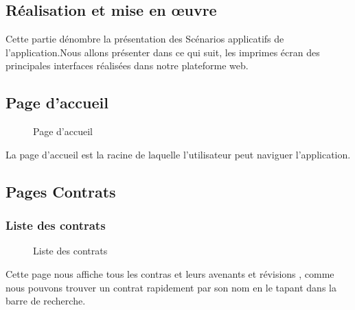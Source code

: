 \documentclass[a4paper]{report}
\begin{document}
\begin{doublespace}
	\chapter{Réalisation et mise en œuvre}
	\fancyhead[L]{\hspace*{5cm}}
	Cette partie dénombre la présentation des Scénarios applicatifs de l’application.Nous allons présenter dans  ce  qui  suit,  les  imprimes écran des principales interfaces réalisées dans notre plateforme web.

\section{Page d'accueil}
\begin{figure}[H]
	\begin{center}
		\caption{Page d'accueil}
	\end{center}
\end{figure}
La page d'accueil est la racine de laquelle l'utilisateur peut naviguer l'application.
\section{Pages Contrats}
\subsection{Liste des contrats}
\begin{figure}[H]
	\begin{center}
		\caption{Liste des contrats}
	\end{center}
\end{figure}
Cette page nous affiche tous les contras et leurs avenants et révisions , comme nous pouvons trouver un contrat rapidement par son nom en le tapant dans la barre de recherche.

\end{doublespace}
\end{document}
